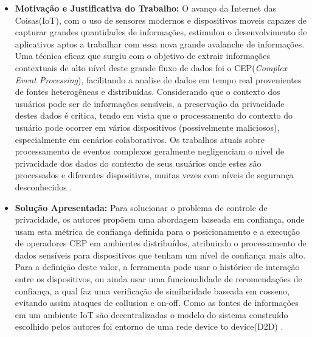 \documentclass[tid,table]{texufpel} %
\begin{document}
\begin{itemize}
	\item \textbf{Motivação e Justificativa do Trabalho:} O avanço da Internet das Coisas(IoT), com o uso de sensores modernos e dispositivos moveis capazes de capturar grandes quantidades de informações, estimulou o desenvolvimento de aplicativos aptos a trabalhar com essa nova grande avalanche de informações. Uma técnica eficaz que surgiu com o objetivo de extrair informações contextuais de alto nível deste grande fluxo de dados foi o CEP(\textit{Complex Event Processing}), facilitando a analise de dados em tempo real provenientes de fontes heterogêneas e distribuídas. Considerando que o contexto dos usuários pode ser de informações sensíveis, a preservação da privacidade destes dados é critica, tendo em vista que o processamento do contexto do usuário pode ocorrer em vários dispositivos (possivelmente maliciosos), especialmente em cenários colaborativos. Os trabalhos atuais sobre processamento de eventos complexos geralmente negligenciam o nível de privacidade dos dados do contexto de seus usuários onde estes são processados e diferentes dispositivos, muitas vezes com níveis de segurança desconhecidos \cite{art6dwarakanath2017trustcep}. 
	
	
	\item \textbf{Solução Apresentada:} Para solucionar o problema de controle de privacidade, os autores propõem uma abordagem baseada em confiança, onde usam esta métrica de confiança definida para o posicionamento e a execução de operadores CEP em ambientes distribuídos, atribuindo o processamento de dados sensíveis para dispositivos que tenham um nível de confiança mais alto. Para a definição deste valor, a ferramenta pode usar o histórico de interação entre os dispositivos, ou ainda usar uma funcionalidade de recomendações de confiança, a qual faz uma verificação de similaridade baseada em cosseno, evitando assim ataques de collusion e on-off. Como as fontes de informações em um ambiente IoT são decentralizadas o modelo do sistema construído escolhido pelos autores foi entorno de uma rede device to device(D2D) \cite{art6dwarakanath2017trustcep}.
	

\end{itemize}
\end{document}
